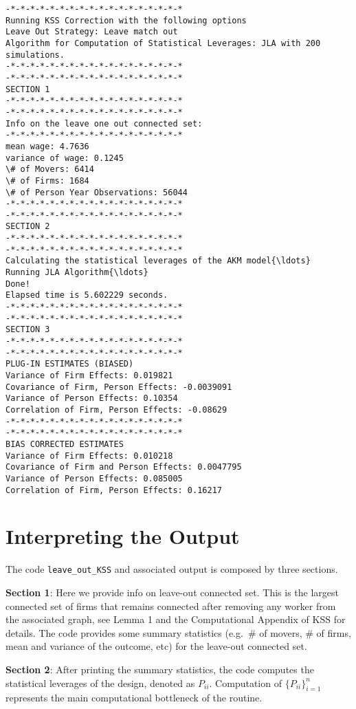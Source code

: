 \documentclass[11pt]{article}
\begin{document}
    \begin{Verbatim}[commandchars=\\\{\}]
-*-*-*-*-*-*-*-*-*-*-*-*-*-*-*-*-*-*
Running KSS Correction with the following options
Leave Out Strategy: Leave match out
Algorithm for Computation of Statistical Leverages: JLA with 200 simulations.
-*-*-*-*-*-*-*-*-*-*-*-*-*-*-*-*-*-*
-*-*-*-*-*-*-*-*-*-*-*-*-*-*-*-*-*-*
SECTION 1
-*-*-*-*-*-*-*-*-*-*-*-*-*-*-*-*-*-*
-*-*-*-*-*-*-*-*-*-*-*-*-*-*-*-*-*-*
Info on the leave one out connected set:
-*-*-*-*-*-*-*-*-*-*-*-*-*-*-*-*-*-*
mean wage: 4.7636
variance of wage: 0.1245
\# of Movers: 6414
\# of Firms: 1684
\# of Person Year Observations: 56044
-*-*-*-*-*-*-*-*-*-*-*-*-*-*-*-*-*-*
-*-*-*-*-*-*-*-*-*-*-*-*-*-*-*-*-*-*
SECTION 2
-*-*-*-*-*-*-*-*-*-*-*-*-*-*-*-*-*-*
-*-*-*-*-*-*-*-*-*-*-*-*-*-*-*-*-*-*
Calculating the statistical leverages of the AKM model{\ldots}
Running JLA Algorithm{\ldots}
Done!
Elapsed time is 5.602229 seconds.
-*-*-*-*-*-*-*-*-*-*-*-*-*-*-*-*-*-*
-*-*-*-*-*-*-*-*-*-*-*-*-*-*-*-*-*-*
SECTION 3
-*-*-*-*-*-*-*-*-*-*-*-*-*-*-*-*-*-*
-*-*-*-*-*-*-*-*-*-*-*-*-*-*-*-*-*-*
PLUG-IN ESTIMATES (BIASED)
Variance of Firm Effects: 0.019821
Covariance of Firm, Person Effects: -0.0039091
Variance of Person Effects: 0.10354
Correlation of Firm, Person Effects: -0.08629
-*-*-*-*-*-*-*-*-*-*-*-*-*-*-*-*-*-*
-*-*-*-*-*-*-*-*-*-*-*-*-*-*-*-*-*-*
BIAS CORRECTED ESTIMATES
Variance of Firm Effects: 0.010218
Covariance of Firm and Person Effects: 0.0047795
Variance of Person Effects: 0.085005
Correlation of Firm, Person Effects: 0.16217
    \end{Verbatim}

    \hypertarget{interpreting-the-output}{%
\section{Interpreting the Output}\label{interpreting-the-output}}

The code \texttt{leave\_out\_KSS} and associated output is composed by
three sections.

\textbf{Section 1}: Here we provide info on leave-out connected set.
This is the largest connected set of firms that remains connected after
removing any worker from the associated graph, see Lemma 1 and the
Computational Appendix of KSS for details.
The code provides some summary statistics (e.g.~\# of movers, \# of
firms, mean and variance of the outcome, etc) for the leave-out
connected set.

\textbf{Section 2}: After printing the summary statistics, the code
computes the statistical leverages of the design, denoted as \(P_{ii}\).
Computation of \(\{P_{ii}\}_{i=1}^{n}\) represents the main
computational bottleneck of the routine.
\end{document}
